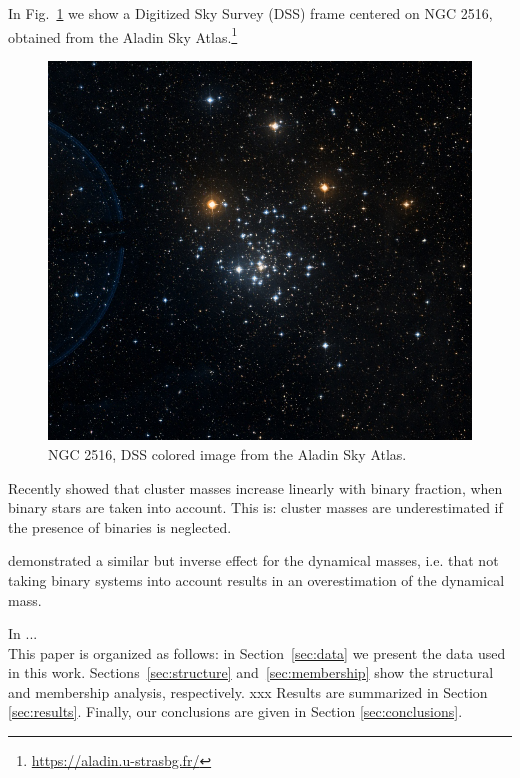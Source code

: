 \documentclass[draft]{aa}
\begin{document}
 In Fig.~\ref{fig:ngc2516} we show a Digitized Sky Survey (DSS) frame centered
 on NGC 2516, obtained from the Aladin Sky
 Atlas.\footnote{\url{https://aladin.u-strasbg.fr/}}

 \begin{figure}
 \centering
 \includegraphics[width=\hsize]{figs/NGC2516_DSS.png}
 \caption{NGC 2516, DSS colored image from the Aladin Sky Atlas.}
 \label{fig:ngc2516}
 \end{figure}

 Recently \cite{Borodina_2021} showed that cluster masses increase linearly with
 binary fraction, when binary stars are taken into account. This is: cluster
 masses are underestimated if the presence of binaries is neglected.

 \cite{Kouwenhoven_2009} demonstrated a similar but inverse effect for the
 dynamical masses, i.e. that not taking binary systems into account results in
 an overestimation of the dynamical mass.


 In \citet{Perren_2015}...\\


 This paper is organized as follows: in Section~\ref{sec:data} we
 present the data used in this work. Sections~\ref{sec:structure}
 and~\ref{sec:membership} show the structural and membership analysis,
 respectively.
 xxx
 Results are summarized in Section \ref{sec:results}. Finally, our
 conclusions are given in Section \ref{sec:conclusions}.
\end{document}
